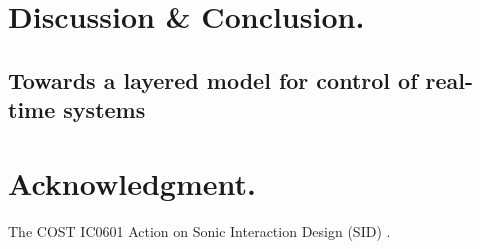 \documentclass{article}
\begin{document}
%

\section{Discussion \& Conclusion.}


\subsection{Towards a layered model for control of real-time systems}



%

\section{Acknowledgment.}

 The COST IC0601 Action on Sonic Interaction Design (SID) .


\small

\end{document}
